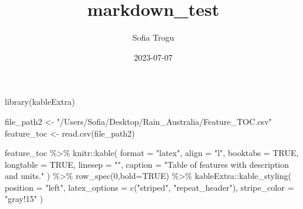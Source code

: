\documentclass[
  landscape]{article}
\title{markdown\_test}
\author{Sofia Trogu}
\date{2023-07-07}
\newenvironment{Shaded}{\begin{snugshade}}{\end{snugshade}}
\newcommand{\AttributeTok}[1]{\textcolor[rgb]{0.77,0.63,0.00}{#1}}
\newcommand{\ConstantTok}[1]{\textcolor[rgb]{0.00,0.00,0.00}{#1}}
\newcommand{\DecValTok}[1]{\textcolor[rgb]{0.00,0.00,0.81}{#1}}
\newcommand{\FunctionTok}[1]{\textcolor[rgb]{0.00,0.00,0.00}{#1}}
\newcommand{\NormalTok}[1]{#1}
\newcommand{\OtherTok}[1]{\textcolor[rgb]{0.56,0.35,0.01}{#1}}
\newcommand{\SpecialCharTok}[1]{\textcolor[rgb]{0.00,0.00,0.00}{#1}}
\newcommand{\StringTok}[1]{\textcolor[rgb]{0.31,0.60,0.02}{#1}}
\begin{document}
\maketitle

{
\setcounter{tocdepth}{2}
\tableofcontents
}
\begin{Shaded}
\begin{Highlighting}[]
\FunctionTok{library}\NormalTok{(kableExtra)}

\NormalTok{file\_path2 }\OtherTok{\textless{}{-}} \StringTok{"/Users/Sofia/Desktop/Rain\_Australia/Feature\_TOC.csv"}
\NormalTok{feature\_toc }\OtherTok{\textless{}{-}} \FunctionTok{read.csv}\NormalTok{(file\_path2)}

\NormalTok{feature\_toc }\SpecialCharTok{\%\textgreater{}\%}
\NormalTok{  knitr}\SpecialCharTok{::}\FunctionTok{kable}\NormalTok{(}
    \AttributeTok{format =} \StringTok{"latex"}\NormalTok{,}
    \AttributeTok{align =} \StringTok{"l"}\NormalTok{,}
    \AttributeTok{booktabs =} \ConstantTok{TRUE}\NormalTok{,}
    \AttributeTok{longtable =} \ConstantTok{TRUE}\NormalTok{,}
    \AttributeTok{linesep =} \StringTok{""}\NormalTok{,}
    \AttributeTok{caption =} \StringTok{"Table of features with description and units."}
\NormalTok{    ) }\SpecialCharTok{\%\textgreater{}\%} \FunctionTok{row\_spec}\NormalTok{(}\DecValTok{0}\NormalTok{,}\AttributeTok{bold=}\ConstantTok{TRUE}\NormalTok{) }\SpecialCharTok{\%\textgreater{}\%} 
\NormalTok{  kableExtra}\SpecialCharTok{::}\FunctionTok{kable\_styling}\NormalTok{(}
      \AttributeTok{position =} \StringTok{"left"}\NormalTok{,}
      \AttributeTok{latex\_options =} \FunctionTok{c}\NormalTok{(}\StringTok{"striped"}\NormalTok{, }\StringTok{"repeat\_header"}\NormalTok{),}
      \AttributeTok{stripe\_color =} \StringTok{"gray!15"}
\NormalTok{    )}
\end{Highlighting}
\end{Shaded}
\end{document}
